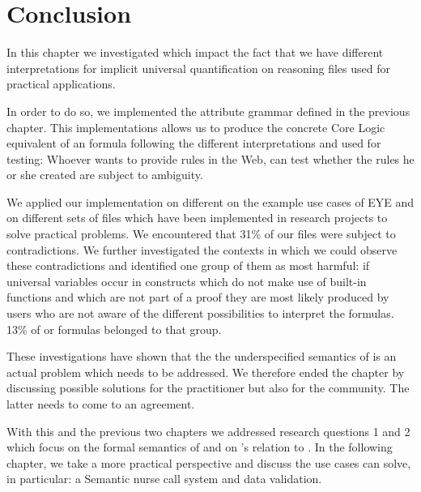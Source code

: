 \section{Conclusion}
In this chapter we investigated which impact the fact that we have different interpretations for implicit universal quantification on 
reasoning files used for practical applications.

In order to do so, we implemented the attribute grammar defined in the previous chapter. 
This implementations allows us to produce the concrete \nthree Core Logic equivalent of an \nthree formula following the different interpretations and 
used for testing: Whoever wants to provide \nthree rules in the Web, can test whether the rules he or she created are subject to ambiguity.  

We applied our implementation on different on the example use cases of EYE and on different sets of files which have been implemented in research projects 
to solve practical problems. We encountered that 31\% of our files were subject to contradictions. 
We further investigated the contexts in which we could observe these contradictions and identified one group of them as most harmful:
if universal variables occur in constructs which do not make use of built-in functions and which are not part of a proof they are most likely produced by users who 
are not aware of the different possibilities to interpret the formulas. 13\% of or formulas belonged to that group.

These investigations have shown that the the underspecified semantics of \nthree is an actual problem which needs to be addressed. We therefore ended the chapter 
by discussing possible solutions for the practitioner but also for the community. The latter needs to come to an agreement. 

With this and the previous two chapters we addressed research questions 1 and 2 which focus on the formal semantics of \nthree and on \nthree's relation to \rdf. In the following 
chapter, we take a more practical perspective and discuss the use cases \nthreelogic can solve, in particular: a Semantic nurse call system and data validation.